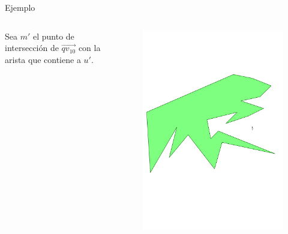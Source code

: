 \documentclass[aspectratio=169,xcolor=dvipsnames, t]{beamer}
\begin{document}
\begin{frame}{Ejemplo}
  \begin{columns}
    \begin{column}{0.3\textwidth}
      \raggedright %
      Sea $m'$ el punto de intersección de $\overrightarrow{qv_{10}}$ con la arista que contiene a $u'$.
    \end{column}
    \begin{column}{0.7\textwidth}
      \vspace{-2.5cm} %
      \begin{figure}
        \centering
        \includegraphics[width=1\linewidth, height=.95\textheight, page=22, keepaspectratio]{IPE/point_visibility.pdf}
      \end{figure}
    \end{column}
  \end{columns}
\end{frame}
\end{document}
